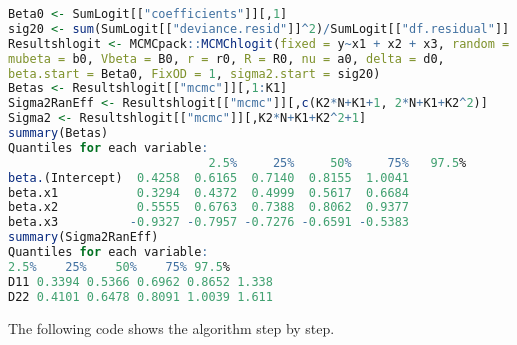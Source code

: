 \begin{enumerate}[leftmargin=*]
\begin{tcolorbox}[enhanced,width=4.67in,center upper,
	fontupper=\large\bfseries,drop shadow southwest,sharp corners]
\begin{VF}
\begin{lstlisting}[language=R]
Beta0 <- SumLogit[["coefficients"]][,1]
sig20 <- sum(SumLogit[["deviance.resid"]]^2)/SumLogit[["df.residual"]]
Resultshlogit <- MCMCpack::MCMChlogit(fixed = y~x1 + x2 + x3, random = ~w1, group="id", data = Data, burnin = burnin, mcmc = mcmc, thin = thin, 
mubeta = b0, Vbeta = B0, r = r0, R = R0, nu = a0, delta = d0,
beta.start = Beta0, FixOD = 1, sigma2.start = sig20)
Betas <- Resultshlogit[["mcmc"]][,1:K1]
Sigma2RanEff <- Resultshlogit[["mcmc"]][,c(K2*N+K1+1, 2*N+K1+K2^2)]
Sigma2 <- Resultshlogit[["mcmc"]][,K2*N+K1+K2^2+1]
summary(Betas)
Quantiles for each variable:
							2.5%     25%     50%     75%   97.5%
beta.(Intercept)  0.4258  0.6165  0.7140  0.8155  1.0041
beta.x1           0.3294  0.4372  0.4999  0.5617  0.6684
beta.x2           0.5555  0.6763  0.7388  0.8062  0.9377
beta.x3          -0.9327 -0.7957 -0.7276 -0.6591 -0.5383
summary(Sigma2RanEff)
Quantiles for each variable:
2.5%    25%    50%    75% 97.5%
D11 0.3394 0.5366 0.6962 0.8652 1.338
D22 0.4101 0.6478 0.8091 1.0039 1.611
\end{lstlisting}
	\end{VF}
\end{tcolorbox}

The following code shows the algorithm step by step.


\end{enumerate}
